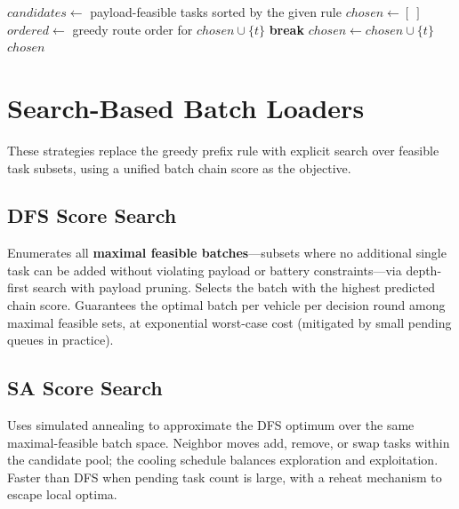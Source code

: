 \begin{algorithm}[H]
    \caption{Greedy Maximal Feasible Batch (shared by all four baselines)}
    \label{algo:greedy_batch}
    \begin{algorithmic}[1]
            \State $candidates \gets$ payload-feasible tasks sorted by the given rule
            \State $chosen \gets [\ ]$
                \State $ordered \gets$ greedy route order for $chosen \cup \{t\}$
                 \textbf{break} \EndIf
                \State $chosen \gets chosen \cup \{t\}$
            \EndFor
            \State \Return $chosen$
        \EndFunction
    \end{algorithmic}
\end{algorithm}

\section{Search-Based Batch Loaders}

These strategies replace the greedy prefix rule with explicit search over feasible task subsets, using a unified batch chain score as the objective.

\subsection{DFS Score Search}

Enumerates all \textbf{maximal feasible batches}---subsets where no additional single task can be added without violating payload or battery constraints---via depth-first search with payload pruning. Selects the batch with the highest predicted chain score. Guarantees the optimal batch per vehicle per decision round among maximal feasible sets, at exponential worst-case cost (mitigated by small pending queues in practice).

\subsection{SA Score Search}

Uses simulated annealing to approximate the DFS optimum over the same maximal-feasible batch space. Neighbor moves add, remove, or swap tasks within the candidate pool; the cooling schedule balances exploration and exploitation. Faster than DFS when pending task count is large, with a reheat mechanism to escape local optima.

